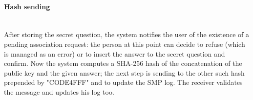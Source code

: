 \paragraph{Hash sending} \hspace{0pt} \\
After storing the secret question, the system notifies the user of the existence of a pending association request: the person at this point can decide to refuse (which is managed as an error) or to insert the answer to the secret question and confirm. Now the system computes a SHA-256 hash of the concatenation of the public key and the given answer; the next step is sending to the other such hash prepended by "CODE4FFF" and to update the SMP log. The receiver validates the message and updates his log too.